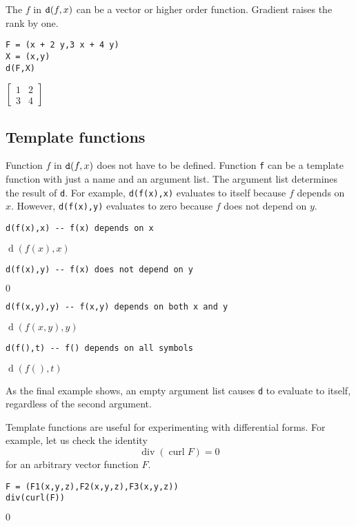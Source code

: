 \bigskip
\noindent
The $f$ in $\text{\tt d}(f,x)$ can be a vector or higher order function.
Gradient raises the rank by one.

{\color{blue}
\begin{verbatim}
F = (x + 2 y,3 x + 4 y)
X = (x,y)
d(F,X)
\end{verbatim}
}

\noindent
$\displaystyle
\begin{bmatrix}
1 & 2
\\[1ex]
3 & 4
\end{bmatrix}
$

\subsection{Template functions}

Function $f$ in $\text{\tt d}(f,x)$ does not have to be defined.
Function \verb$f$ can be a template function with just a name and an argument list.
The argument list determines the result of \verb$d$.
For example, \verb$d(f(x),x)$ evaluates to itself because $f$ depends on $x$.
However, \verb$d(f(x),y)$ evaluates to zero because $f$ does not depend on $y$.

{\color{blue}
\begin{verbatim}
d(f(x),x) -- f(x) depends on x
\end{verbatim}
}

\noindent
$\operatorname{d}(f(x),x)$

{\color{blue}
\begin{verbatim}
d(f(x),y) -- f(x) does not depend on y
\end{verbatim}
}

\noindent
$0$

{\color{blue}
\begin{verbatim}
d(f(x,y),y) -- f(x,y) depends on both x and y
\end{verbatim}
}

\noindent
$\operatorname{d}(f(x,y),y)$

{\color{blue}
\begin{verbatim}
d(f(),t) -- f() depends on all symbols
\end{verbatim}
}

\noindent
$\operatorname{d}(f(),t)$

\bigskip
\noindent
As the final example shows, an empty argument list causes
\verb$d$ to evaluate to itself, regardless
of the second argument.

\bigskip
\noindent
Template functions are useful for experimenting with differential forms.
For example, let us check the identity
$$\operatorname{div}(\operatorname{curl}{F})=0$$
for an arbitrary vector function $F$.

{\color{blue}
\begin{verbatim}
F = (F1(x,y,z),F2(x,y,z),F3(x,y,z))
div(curl(F))
\end{verbatim}
}

\noindent
$0$
